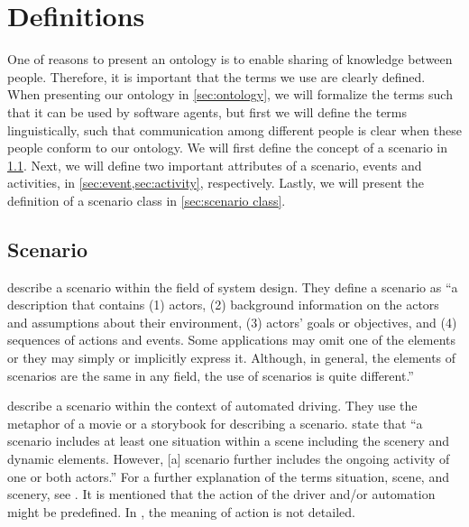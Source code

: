 \section{Definitions}
\label{sec:definitions}

One of reasons to present an ontology is to enable sharing of knowledge between people. Therefore, it is important that the terms we use are clearly defined. When presenting our ontology in \cref{sec:ontology}, we will formalize the terms such that it can be used by software agents, but first we will define the terms linguistically, such that communication among different people is clear when these people conform to our ontology. We will first define the concept of a scenario in \cref{sec:scenario}. Next, we will define two important attributes of a scenario, events and activities, in \cref{sec:event,sec:activity}, respectively. Lastly, we will present the definition of a scenario class in \cref{sec:scenario class}.



\subsection{Scenario}
\label{sec:scenario}

\textcite{go2004blind} describe a scenario within the field of system design. They define a scenario as ``a description that contains (1) actors, (2) background information on the actors and assumptions about their environment, (3) actors' goals or objectives, and (4) sequences of actions and events. Some applications may omit one of the elements or they may simply or implicitly express it. Although, in general, the elements of scenarios are the same in any field, the use of scenarios is quite different.'' 

\textcite{geyer2014} describe a scenario within the context of automated driving. They use the metaphor of a movie or a storybook for describing a scenario. \textcite{geyer2014} state that ``a scenario includes at least one situation within a scene including the scenery and dynamic elements. However, [a] scenario further includes the ongoing activity of one or both actors.'' For a further explanation of the terms situation, scene, and scenery, see \cite{geyer2014}. It is mentioned that the action of the driver and/or automation might be predefined. In \cite{geyer2014}, the meaning of action is not detailed.

